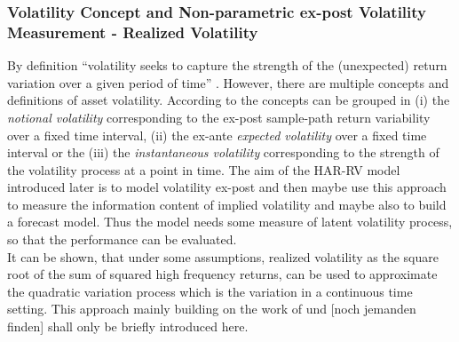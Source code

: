\subsubsection{Volatility Concept and Non-parametric ex-post Volatility Measurement - Realized Volatility}\label{sec:221RV}
By definition ``volatility seeks to capture the strength of the (unexpected) return variation over a given period of time'' \parencite[p.7]{andersen2001}. However, there are multiple concepts and definitions of asset volatility. According to \citeauthor{andersen2001} the concepts can be grouped in (i) the \emph{notional volatility} corresponding to the ex-post sample-path return variability over a fixed time interval, (ii) the ex-ante \emph{expected volatility} over a fixed time interval or the (iii) the \emph{instantaneous volatility} corresponding to the strength of the volatility process at a point in time.
The aim of the HAR-RV model introduced later is to model volatility ex-post and then maybe use this approach to measure the information content of implied volatility and maybe also to build a forecast model. Thus the model needs some measure of latent volatility process, so that the performance can be evaluated. \\
It can be shown, that under some assumptions, realized volatility as the square root of the sum of squared high frequency returns, can be used to approximate the quadratic variation process which is the variation in a continuous time setting. This approach mainly building on the work of \citeauthor{andersen2001} und [noch jemanden finden] shall only be briefly introduced here. \\
